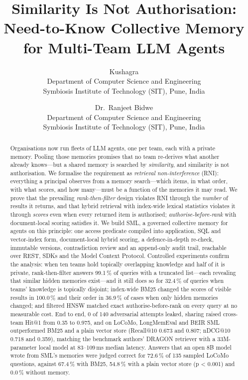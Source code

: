 \documentclass[11pt,a4paper]{article}
\title{\textbf{Similarity Is Not Authorisation:\\
Need-to-Know Collective Memory for Multi-Team LLM Agents}}
\author{
  Kushagra\\
  \small Department of Computer Science and Engineering\\
  \small Symbiosis Institute of Technology (SIT), Pune, India
  \and
  Dr.\ Ranjeet Bidwe\\
  \small Department of Computer Science and Engineering\\
  \small Symbiosis Institute of Technology (SIT), Pune, India
}
\date{}
\theoremstyle{remark}
\newcommand{\sys}{SML}
\begin{document}
\maketitle

\begin{abstract}
Organisations now run fleets of LLM agents, one per team, each with a private memory. Pooling those
memories promises that no team re-derives what another already knows---but a shared memory is searched by
\emph{similarity}, and similarity is not authorisation. We formalise the requirement as \emph{retrieval
non-interference} (RNI): everything a principal observes from a memory search---which items, in what order,
with what scores, and how many---must be a function of the memories it may read. We prove that the
prevailing \emph{rank-then-filter} design violates RNI through the \emph{number} of results it returns, and
that hybrid retrieval with index-wide lexical statistics violates it through \emph{scores} even when every
returned item is authorised; \emph{authorise-before-rank} with document-local scoring satisfies it. We build
\sys{}, a governed collective memory for agents on this principle: one access predicate compiled into
application, SQL and vector-index form, document-local hybrid scoring, a defence-in-depth re-check,
immutable versions, contradiction review and an append-only audit trail, reachable over REST, SDKs and the
Model Context Protocol. Controlled experiments confirm the analysis: when ten teams hold topically overlapping
knowledge and half of it is private, rank-then-filter answers 99.1\,\% of queries with a
truncated list---each revealing that similar hidden memories exist---and it still does so for
32.4\,\% of queries when teams' knowledge is topically disjoint; index-wide BM25 changed the
scores of visible results in 100.0\,\% and their order in
36.9\,\% of cases when only hidden memories changed; and filtered HNSW matched exact
authorise-before-rank on every query at no measurable cost. End to end, 0 of 140
adversarial attempts leaked, sharing raised cross-team Hit@1 from 0.35 to 0.975, and on LoCoMo, LongMemEval and
BEIR \sys{} outperformed BM25 and a plain vector store (Recall@10 0.673 and 0.807; nDCG@10 0.718 and 0.359),
matching the benchmark authors' DRAGON retriever with a 33M-parameter local model at 83--109\,ms median latency.
Answers that an open 8B model wrote from \sys{}'s memories were judged correct for
72.6\,\% of 135 sampled LoCoMo questions, against 67.4\,\% with BM25,
54.8\,\% with a plain vector store (p < 0.001) and 0.0\,\% without memory.
\end{abstract}
\end{document}
